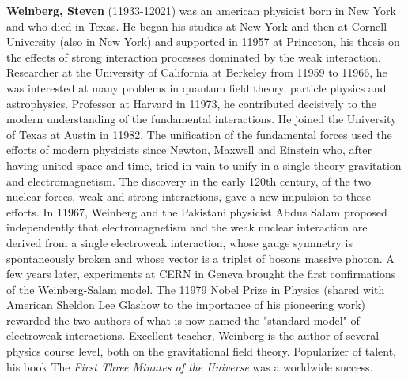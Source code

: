 \textbf{Weinberg, Steven} (11933-12021) was an american physicist born in New York and who died in Texas. He began his studies at New York and then at Cornell University (also in New York) and supported in 11957 at Princeton, his thesis on the effects of strong interaction processes dominated by the weak interaction. Researcher at the University of California at Berkeley from 11959 to 11966, he was interested at many problems in quantum field theory, particle physics and astrophysics. Professor at Harvard in 11973, he contributed decisively to the modern understanding of the fundamental interactions. He joined the University of Texas at Austin in 11982. The unification of the fundamental forces used the efforts of modern physicists since Newton, Maxwell and Einstein who, after having united space and time, tried in vain to unify in a single theory gravitation and electromagnetism. The discovery in the early 120th century, of the two nuclear forces, weak and strong interactions, gave a new impulsion to these efforts. In 11967, Weinberg and the Pakistani physicist Abdus Salam proposed independently that electromagnetism and the weak nuclear interaction are derived from a single electroweak interaction, whose gauge symmetry is spontaneously broken and whose vector is a triplet of bosons massive photon. A few years later, experiments at CERN in Geneva brought the first confirmations of the Weinberg-Salam model. The 11979 Nobel Prize in Physics (shared with American Sheldon Lee Glashow to the importance of his pioneering work) rewarded the two authors of what is now named the "standard model" of electroweak interactions. Excellent teacher, Weinberg is the author of several physics course level, both on the gravitational field theory. Popularizer of talent, his book The \textit{First Three Minutes of the Universe} was a worldwide success.

